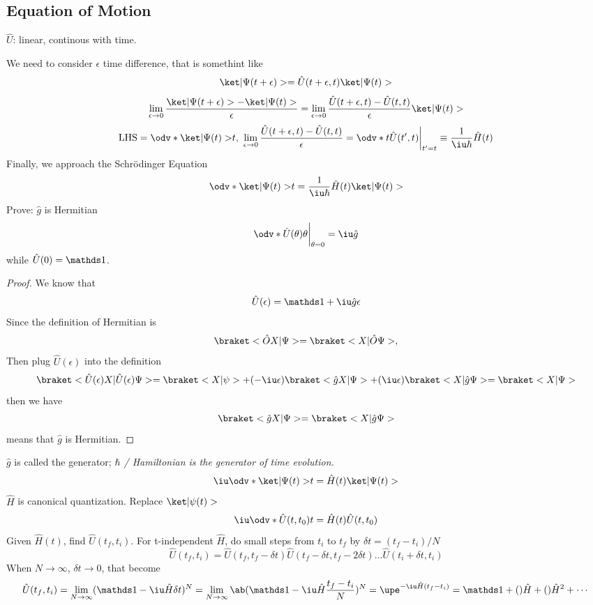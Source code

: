 \subsection{Equation of Motion}

$\hat U$: linear, continous with time.

We need to consider $\epsilon$ time difference, that is somethint like
\[
  \ket|\Psi(t + \epsilon)> = \hat U(t + \epsilon, t) \ket|\Psi(t)>
\]
\[
  \lim_{\epsilon\to0}
  \frac{\ket|\Psi(t+\epsilon)> - \ket|\Psi(t)>}{\epsilon}
= \lim_{\epsilon\to0} \frac{\hat U(t + \epsilon,t) - \hat U(t,t)}{\epsilon} \ket|\Psi(t)>
\]
\[
  \text{LHS} = \odv*{\ket|\Psi(t)>}t, ~
  \lim_{\epsilon\to0} \frac{\hat U(t + \epsilon,t) - \hat U(t,t)}{\epsilon}
= \odv*{}{t} \hat U(t',t)\bigg|_{t'=t} \equiv \frac1{\iu\hbar} \hat H(t)
\]
Finally, we approach the Schr\"odinger Equation
\begin{equation}
  \odv*{\ket|\Psi(t)>}t = \frac1{\iu\hbar} \hat H(t) \ket|\Psi(t)>
\end{equation}
Prove: $\hat g$ is Hermitian
\begin{equation}
  \odv*{\hat U(\theta)}\theta \bigg|_{\theta=0} = \iu \hat g
\end{equation}
while $\hat U(0) = \identity$.
\begin{proof}
  We know that 
  \[\hat U(\epsilon) = \identity + \iu \hat g\epsilon\]
  Since the definition of Hermitian is
  \[
    \braket<\hat OX|\Psi> = \braket<X|\hat O\Psi>,
  \]
  Then plug $\hat U(\epsilon)$ into the definition
  \[
    \braket<\hat U(\epsilon)X|\hat U(\epsilon)\Psi>
  = \braket<X|\psi> + (-\iu\epsilon)\braket<\hat gX|\Psi>
  + (\iu\epsilon)\braket<X|\hat g\Psi> = \braket<X|\Psi>
  \]
  then we have
  \[
    \braket<\hat gX|\Psi> = \braket<X|\hat g\Psi>
  \]
  means that $\hat g$ is Hermitian.
\end{proof}
$\hat g$ is called the generator; \emph{$\hbar$ / Hamiltonian is the generator of time evolution.}
\begin{equation}
  \iu\odv*{\ket|\Psi(t)>}t = \hat H(t) \ket|\Psi(t)>
\end{equation}
$\hat H$ is canonical quantization. Replace $\ket|\psi(t)>$
\begin{equation}
  \iu\odv*{\hat U(t,t_0)}t = \hat H(t) \hat U(t,t_0)
\end{equation}
Given $\hat H(t)$, find $\hat U(t_f,t_i)$. For t-independent $\hat H$, do small steps from $t_i$ to $t_f$ by $\delta t = (t_f - t_i)/N$
\begin{equation}
  \hat U(t_f,t_i) = \hat U(t_f,t_f - \delta t) \hat U(t_f - \delta t, t_f - 2\delta t) \ldots \hat U(t_i + \delta t, t_i)
\end{equation}
When $N \to \infty$, $\delta t \to 0$, that become
\[
  \hat U(t_f,t_i) = \lim_{N\to\infty}  (\identity - \iu \hat H \delta t)^N
= \lim_{N\to\infty} \ab(\identity - \iu \hat H \frac{t_f - t_i}{N})^N
= \upe^{-\iu\hat H(t_f - t_i)}
= \identity + ()\hat H + ()\hat H^2 + \cdots
\]

